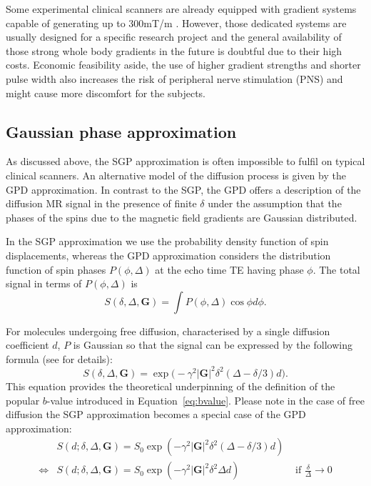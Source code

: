 Some experimental clinical scanners are already equipped with gradient systems capable of generating up to 300mT/m \citep{Toga:2012}. However, those dedicated systems are usually designed for a specific research project and the general availability of those strong whole body gradients in the future is doubtful due to their high costs. Economic feasibility aside, the use of higher gradient strengths and shorter pulse width also increases the risk of peripheral nerve stimulation (PNS) and might cause more discomfort for the subjects. 

\subsection{Gaussian phase approximation}
\label{sec:chapter 2GPD}
As discussed above, the SGP approximation is often impossible to fulfil on typical clinical scanners. An alternative model of the diffusion process is given by the \gls{GPD} approximation. In contrast to the \gls{SGP}, the \gls{GPD} offers a description of the diffusion MR signal in the presence of finite $\delta$ under the assumption that the phases of the spins due to the magnetic field gradients are Gaussian distributed.

In the SGP approximation we use the probability density function of spin displacements, whereas the GPD approximation considers the distribution function of spin phases $P(\phi,\Delta)$ at the echo time TE  having phase $\phi$. The total signal in terms of $P(\phi,\Delta)$ is
\begin{equation}
S(\delta,\Delta,\textbf{G})  = \int P(\phi,\Delta)\cos\phi d\phi.
\end{equation}

For molecules undergoing free diffusion, characterised by a single diffusion coefficient $d$,  $P$ is Gaussian so that the signal can be expressed by the following formula (see \citet{Price:1998} for details):
\begin{equation}
S(\delta,\Delta,\textbf{G})  =  \exp\Big(- \gamma^{2} |\textbf{G}|^{2} \delta^{2} (\Delta - \delta/3) d\Big).
\label{freediff}
\end{equation}
This equation provides the theoretical underpinning of the definition of the popular $b$-value introduced in Equation~\ref{eq:bvalue}. Please note in the case of free diffusion the SGP approximation becomes a special case of the \gls{GPD} approximation:
\begin{align}
				   & S(d;\delta,\Delta,\textbf{G})   =  S_0\exp(-\gamma^{2} |\textbf{G}|^{2} \delta^{2} (\Delta - \delta/3) d) & \\ 
\Leftrightarrow & S(d;\delta,\Delta,\textbf{G})   =  S_0\exp(-\gamma^{2} |\textbf{G}|^{2} \delta^{2} \Delta d)	& \mbox{ if }\frac{\delta}{\Delta}\to 0 
\label{eq: chapter2 GPD vs SGP free diff}
\end{align}
